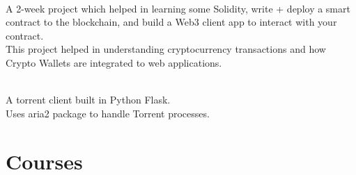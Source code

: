 \documentclass[]{resume}
\begin{document}
\begin{minipage}[t]{0.60\textwidth}
 \\
\textbullet{} A 2-week project which helped in learning some Solidity, write + deploy a smart contract to the blockchain, and build a Web3 client app to interact with your contract. \\
\textbullet{} This project helped in understanding cryptocurrency transactions and how Crypto Wallets are integrated to web applications.\\ 
\bigskip

\href{https://github.com/KRPoojari/torrpydo-app} {} \\
\textbullet{} A torrent client built in Python Flask.\\
\textbullet{} Uses aria2 package to handle Torrent processes.\\ 
\bigskip
\bigskip


\section{Courses}
\\
\sectionsep

\medskip




%
%

\end{minipage}
\hfill
\end{document}
